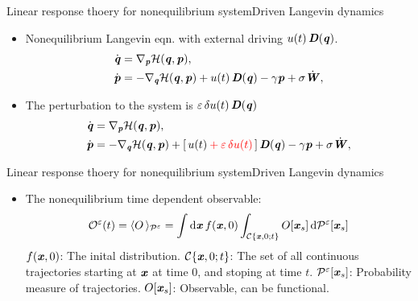 \documentclass[fleqn]{beamer}
\newcommand{\redc}[1]{{\color{red} #1}}
\newcommand{\bluec}[1]{{\color{blue} #1}}
\newcommand{\vect}[1]{\textbf{\textit{#1}}}
\newcommand{\dd}[0]{\textrm{d}}
\newcommand{\fe}{u}
\newcommand{\mh}{\mathcal H}
\newcommand{\eps}{\varepsilon}
\newcommand{\mo}{\mathcal O}
\newcommand{\mc}{\mathcal C}
\newcommand{\pathmeas}{\mathcal P}
\begin{document}
\begin{frame}{Linear response thoery for nonequilibrium system}{Driven Langevin dynamics}
  \begin{itemize}
  \item <1-> Nonequilibrium
    Langevin eqn. with external driving \bluec{$\fe(t)\,\vect D(\vect q)$}.
    \bluec{
      \begin{align*}
        \dot{\vect q} & = \nabla_{\vect p}\mh(\vect q,\vect p), \\
        \dot{\vect p} & =- \nabla_{\vect q}\mh(\vect q,\vect p)
        + \fe(t)\, \vect D(\vect q)
        - \gamma\vect p
        + \sigma\dot{\vect W},
      \end{align*}
    }
  \item <2-> 
    The perturbation to the system is \redc{$\eps\,\delta \fe(t)\,\vect D(\vect q)$}
    \bluec{
      \begin{align*}
        \dot{\vect q} & = \nabla_{\vect p}\mh(\vect q,\vect p), \\
        \dot{\vect p} & =- \nabla_{\vect q}\mh(\vect q,\vect p)
        + [\,\fe(t)\redc{ \:+\: \eps\,\delta \fe(t)}\,]\, \vect D(\vect q)
        - \gamma\vect p
        + \sigma\dot{\vect W},
      \end{align*}
    }
  \end{itemize}
\end{frame}


\begin{frame}{Linear response thoery for nonequilibrium system}{Driven Langevin dynamics}
  \begin{itemize}
  \item <1-> The nonequilibrium time dependent observable:
    \bluec{
      \begin{align*}
        \mo^\eps(t) = \langle O\,\rangle_{\pathmeas^\eps}
        = \int \dd \vect x\, f(\vect x, 0)
        \int_{\mc\{\vect x,0; t\}} O[\vect x_s]\,\dd \pathmeas^\eps[\vect x_s]
      \end{align*}
    }
    \bluec{$f(\vect x, 0)$}: The inital distribution.
    \bluec{$\mc\{\vect x,0; t\}$}: The set of all continuous trajectories starting at $\vect x$ at time 0, and stoping at time $t$.
    \bluec{$\pathmeas^\eps[\vect x_s]$}: Probability measure of trajectories.   
    \bluec{$O[\vect x_s]$}: Observable, can be functional.
  \end{itemize}
\end{frame}
\end{document}
